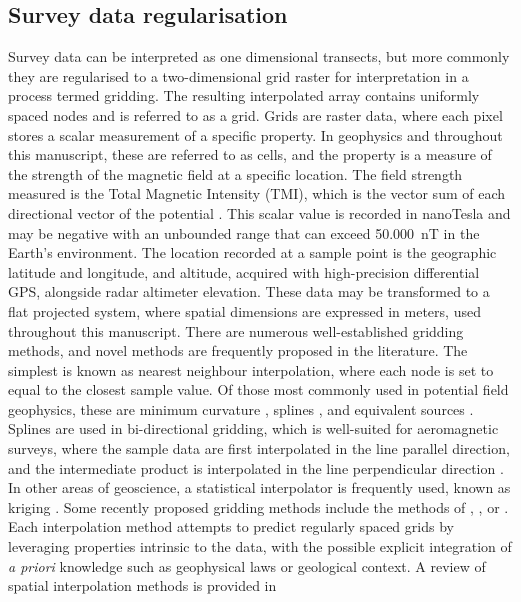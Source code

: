 \documentclass[manuscript.tex]{subfiles}
\begin{document}
\subsection{Survey data regularisation}
Survey data can be interpreted as one dimensional transects, but more commonly they are regularised to a two-dimensional grid raster for interpretation in a process termed gridding.
The resulting interpolated array contains uniformly spaced nodes and is referred to as a grid.
Grids are raster data, where each pixel stores a scalar measurement of a specific property.
In geophysics and throughout this manuscript, these are referred to as cells, and the property is a measure of the strength of the magnetic field at a specific location.
The field strength measured is the Total Magnetic Intensity (TMI), which is the vector sum of each directional vector of the potential \parencite{blakelyPotentialTheoryGravity1996}.
This scalar value is recorded in nanoTesla and may be negative with an unbounded range that can exceed \qty{50,000}{\nano\tesla} in the Earth's environment.
The location recorded at a sample point is the geographic latitude and longitude, and altitude, acquired with high-precision differential GPS, alongside radar altimeter elevation.
These data may be transformed to a flat projected system, where spatial dimensions are expressed in meters, used throughout this manuscript.
There are numerous well-established gridding methods, and novel methods are frequently proposed in the literature.
The simplest is known as nearest neighbour interpolation, where each node is set to equal to the closest sample value.
Of those most commonly used in potential field geophysics, these are minimum curvature \parencite{briggsMachineContouringUsing1974}, splines \parencite{bhattacharyyaBicubicSplineInterpolation1969,shureHarmonicSplinesGeomagnetic1982,smithGriddingContinuousCurvature1990}, and equivalent sources \parencite{dampneyEquivalentSourceTechnique1969, solerBetterStrategyInterpolating2020}.
Splines are used in bi-directional gridding, which is well-suited for aeromagnetic surveys, where the sample data are first interpolated in the line parallel direction, and the intermediate product is interpolated in the line perpendicular direction \parencite{dentithGeophysicsMineralExploration2014}.
In other areas of geoscience, a statistical interpolator is frequently used, known as kriging \parencite{hansenInterpretiveGriddingAnisotropic1993,davis1986statistics}.
Some recently proposed gridding methods include the methods of \textcite{naprstekNewMethodInterpolating2019}, \textcite{xuGravityAnomalyReconstruction2019}, or \textcite{chenPotentialFieldData2022}.
Each interpolation method attempts to predict regularly spaced grids by leveraging properties intrinsic to the data, with the possible explicit integration of \emph{a priori} knowledge such as geophysical laws or geological context.
A review of spatial interpolation methods is provided in \textcite{liReviewComparativeStudies2011}
\end{document}
